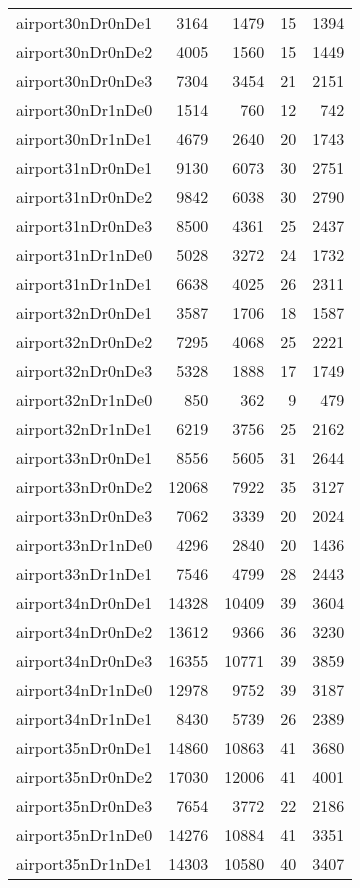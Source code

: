 \begin{longtable}{lrrrr}
airport30nDr0nDe1 & 3164 & 1479 & 15 & 1394 \\
airport30nDr0nDe2 & 4005 & 1560 & 15 & 1449 \\
airport30nDr0nDe3 & 7304 & 3454 & 21 & 2151 \\
airport30nDr1nDe0 & 1514 & 760 & 12 & 742 \\
airport30nDr1nDe1 & 4679 & 2640 & 20 & 1743 \\
airport31nDr0nDe1 & 9130 & 6073 & 30 & 2751 \\
airport31nDr0nDe2 & 9842 & 6038 & 30 & 2790 \\
airport31nDr0nDe3 & 8500 & 4361 & 25 & 2437 \\
airport31nDr1nDe0 & 5028 & 3272 & 24 & 1732 \\
airport31nDr1nDe1 & 6638 & 4025 & 26 & 2311 \\
airport32nDr0nDe1 & 3587 & 1706 & 18 & 1587 \\
airport32nDr0nDe2 & 7295 & 4068 & 25 & 2221 \\
airport32nDr0nDe3 & 5328 & 1888 & 17 & 1749 \\
airport32nDr1nDe0 & 850 & 362 & 9 & 479 \\
airport32nDr1nDe1 & 6219 & 3756 & 25 & 2162 \\
airport33nDr0nDe1 & 8556 & 5605 & 31 & 2644 \\
airport33nDr0nDe2 & 12068 & 7922 & 35 & 3127 \\
airport33nDr0nDe3 & 7062 & 3339 & 20 & 2024 \\
airport33nDr1nDe0 & 4296 & 2840 & 20 & 1436 \\
airport33nDr1nDe1 & 7546 & 4799 & 28 & 2443 \\
airport34nDr0nDe1 & 14328 & 10409 & 39 & 3604 \\
airport34nDr0nDe2 & 13612 & 9366 & 36 & 3230 \\
airport34nDr0nDe3 & 16355 & 10771 & 39 & 3859 \\
airport34nDr1nDe0 & 12978 & 9752 & 39 & 3187 \\
airport34nDr1nDe1 & 8430 & 5739 & 26 & 2389 \\
airport35nDr0nDe1 & 14860 & 10863 & 41 & 3680 \\
airport35nDr0nDe2 & 17030 & 12006 & 41 & 4001 \\
airport35nDr0nDe3 & 7654 & 3772 & 22 & 2186 \\
airport35nDr1nDe0 & 14276 & 10884 & 41 & 3351 \\
airport35nDr1nDe1 & 14303 & 10580 & 40 & 3407 \\

\end{longtable}
